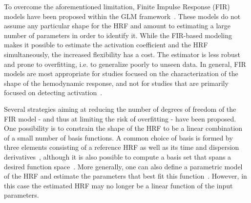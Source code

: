 
To overcome the aforementioned limitation, Finite Impulse Response (FIR) models have been
proposed within the GLM framework~\citep{Dale1999,Glover1999}.
These models do not assume any particular shape for the HRF and amount to
estimating a large number of parameters in order to identify it. 
While the FIR-based modeling makes it possible to estimate the
activation coefficient and the HRF simultaneously, the increased flexibility
has a cost. The estimator is less robust and prone to overfitting, i.e. to generalize poorly to unseen data. 
In general, FIR
models are most appropriate for studies focused on the characterization of the
shape of the hemodynamic response, and not for studies that are primarily
focused on detecting activation~\cite[Chapter~5]{Poldrack}.

Several strategies aiming at reducing the number of degrees of freedom of the
FIR model - and thus at limiting the risk of overfitting - have been proposed.
One possibility is to constrain the shape of the HRF to be a linear
combination of a small number of basis functions. A common choice of basis is 
formed by three elements consisting of a reference HRF as well as its time and dispersion
derivatives~\citep{friston1998nonlinear}, although it is also possible to compute a
basis set that spans a desired function
space~\citep{Woolrich2004}. More generally, one can also define a parametric
model of the HRF and estimate the parameters that best fit this
function~\citep{Lindquist2007}. However, in this case the estimated HRF may no longer be a linear function of the input parameters. 

